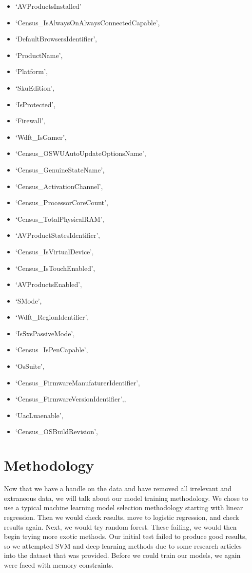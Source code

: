 \documentclass[sigconf]{acmart}
\begin{document}
\begin{itemize}
\item `AVProductsInstalled' 
\item `Census\_IsAlwaysOnAlwaysConnectedCapable',
\item `DefaultBrowsersIdentifier',
\item `ProductName',
\item `Platform',
\item `SkuEdition',
\item `IsProtected',
\item `Firewall',
\item `Wdft\_IsGamer',
\item `Census\_OSWUAutoUpdateOptionsName',
\item `Census\_GenuineStateName',
\item `Census\_ActivationChannel',
\item `Census\_ProcessorCoreCount',                               
\item `Census\_TotalPhysicalRAM',                             
\item `AVProductStatesIdentifier',
\item `Census\_IsVirtualDevice',
\item `Census\_IsTouchEnabled',
\item `AVProductsEnabled',
\item `SMode',
\item `Wdft\_RegionIdentifier',
\item `IsSxsPassiveMode',
\item `Census\_IsPenCapable',
\item `OsSuite',
\item `Census\_FirmwareManufaturerIdentifier',
\item `Census\_FirmwareVersionIdentifier',,
\item `UacLuaenable',
\item `Census\_OSBuildRevision',
\end{itemize}

\section{Methodology}
Now that we have a handle on the data and have removed all irrelevant and extraneous data, we will talk about our model training methodology.  We chose to use a typical machine learning model selection methodology starting with linear regression. Then we would check results, move to logistic regression, and check results again. Next, we would try random forest. These failing, we would then begin trying more exotic methods. Our initial test failed to produce good results, so we attempted SVM and deep learning methods due to some research articles into the dataset that was provided. Before we could train our models, we again were faced with memory constraints.
\end{document}
